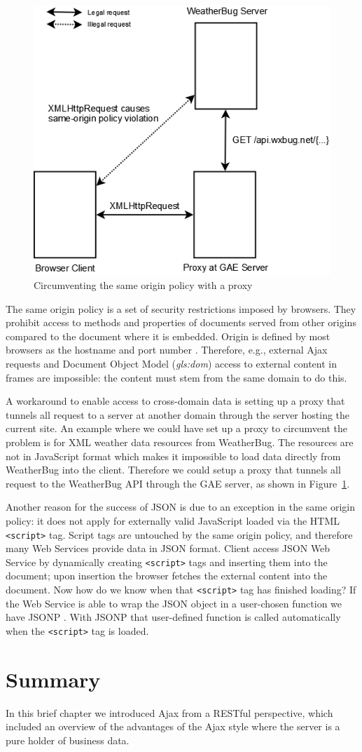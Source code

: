 \begin{figure}[htbp]
  \centering
  \includegraphics[scale=0.3]{./Figures/proxy}
  \caption{Circumventing the same origin policy with a proxy}
  \label{fig:proxy}
\end{figure}

The same origin policy is a set of security restrictions imposed by
browsers. They prohibit access to methods and properties of documents served from
other origins compared to the document where it is embedded. Origin is defined by
most browsers as the hostname and port number
\citep{browsersec:part2}. Therefore, e.g., external Ajax requests and Document
Object Model (\textit{\gls{gls:dom}}) access to external content in frames are
impossible: the content must stem from the same domain to do this.

A workaround to enable access to cross-domain data is setting up a proxy that
tunnels all request to a server at another domain through the server hosting the
current site. An example where we could have set up a proxy to circumvent the
problem is for XML weather data resources from WeatherBug. The resources are not
in JavaScript format which makes it impossible to load data directly from
WeatherBug into the client. Therefore we could setup a proxy that tunnels all
request to the WeatherBug API through the GAE server, as shown in
Figure~\ref{fig:proxy}.

Another reason for the success of JSON is due to an exception in the same origin
policy: it does not apply for externally valid JavaScript loaded via the HTML
\verb|<script>| tag. Script tags are untouched by the same origin policy, and
therefore many Web Services provide data in JSON format. Client access JSON
Web Service by dynamically creating \verb|<script>| tags and inserting them into
the document; upon insertion the browser fetches the external content into the
document. Now how do we know when that \verb|<script>| tag has finished loading?
If the Web Service is able to wrap the JSON object in a user-chosen function we
have JSONP \citep{json:defined}. With JSONP that user-defined function is called
automatically when the \verb|<script>| tag is loaded. 

\section{Summary}
In this brief chapter we introduced Ajax from a RESTful perspective, which
included an overview of the advantages of the Ajax style where the server is a
pure holder of business data.
